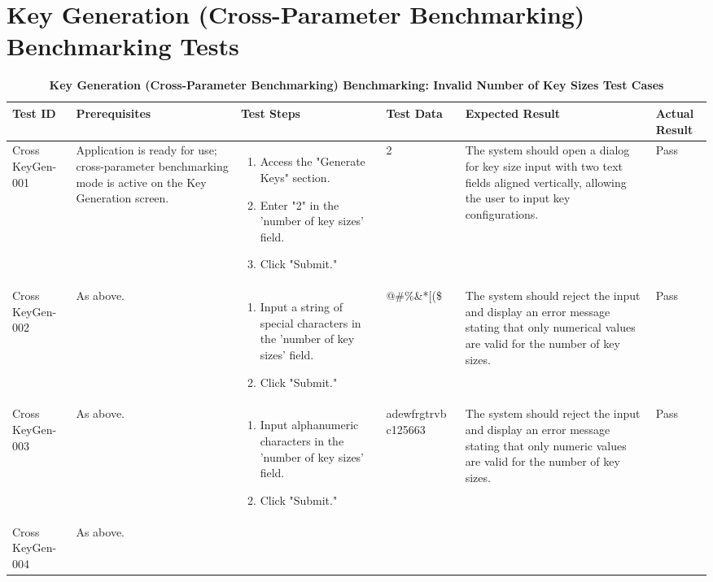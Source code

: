 \documentclass[]{final_report}
\theoremstyle{definition}
\begin{document}
\section*{Key Generation (Cross-Parameter Benchmarking) Benchmarking Tests}

\begin{longtable}{|l|p{2.5cm}|p{2.5cm}|p{2.5cm}|p{2.5cm}|p{3cm}|}
  \caption{\textbf{Key Generation (Cross-Parameter Benchmarking) Benchmarking: Invalid Number of Key Sizes Test Cases}} \\
  \hline
  \textbf{Test ID} & \textbf{Prerequisites} & \textbf{Test Steps} & \textbf{Test Data} & \textbf{Expected Result} & \textbf{Actual Result} \\
  \hline
  Cross
  KeyGen-001 & Application is ready for use; cross-parameter benchmarking mode is active on the Key Generation screen. & 
  \begin{enumerate}
  \item Access the "Generate Keys" section.
  \item Enter "2" in the 'number of key sizes' field.
  \item Click "Submit."
  \end{enumerate} & 2 & The system should open a dialog for key size input with two text fields aligned vertically, allowing the user to input key configurations. & Pass \\
  \hline
  Cross
  KeyGen-002 & As above. & 
  \begin{enumerate}
  \item Input a string of special characters in the 'number of key sizes' field.
  \item Click "Submit."
  \end{enumerate} & @\#\%\&*[(\$ & The system should reject the input and display an error message stating that only numerical values are valid for the number of key sizes. & Pass \\
  \hline
   Cross
   KeyGen-003 & As above. & 
  \begin{enumerate}
  \item Input alphanumeric characters in the 'number of key sizes' field.
  \item Click "Submit."
  \end{enumerate} & adewfrgtrvb
  c125663 & The system should reject the input and display an error message stating that only numeric values are valid for the number of key sizes. & Pass \\
  \hline
   Cross
   KeyGen-004 & As above. & 
  \begin{enumerate}

\end{enumerate}
\end{longtable}
\end{document}
